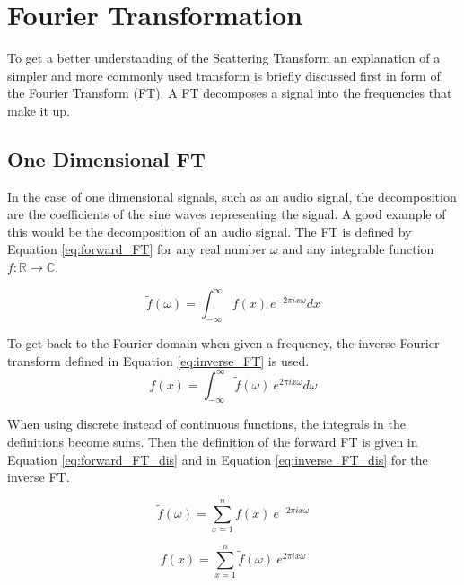 
\section{Fourier Transformation}
\label{sec:fourier_transform}

To get a better understanding of the Scattering Transform an explanation of a simpler and more commonly used transform is briefly discussed first in form of the Fourier Transform (FT). A FT decomposes a signal into the frequencies that make it up.

\subsection{One Dimensional FT} 

In the case of one dimensional signals, such as an audio signal, the decomposition are the coefficients of the sine waves representing the signal. A good example of this would be the decomposition of an audio signal. The FT is defined by Equation \ref{eq:forward_FT} for any real number $\omega$ and any integrable function $f:\mathbb{R} \rightarrow \mathbb{C}$. 

\begin{equation}
	\tilde{f}(\omega) = \int_{-\infty}^{\infty} f(x)\ e^{-2\pi i x \omega}dx
	\label{eq:forward_FT}
\end{equation} 

To get back to the Fourier domain when given a frequency, the inverse Fourier transform defined in Equation \ref{eq:inverse_FT} is used.  \\

\begin{equation}
	f(x) = \int_{-\infty}^{\infty} \tilde{f}(\omega)\ e^{2 \pi i x \omega}d\omega
	\label{eq:inverse_FT}
\end{equation}

When using discrete instead of continuous functions, the integrals in the definitions become sums. Then the definition of the forward FT is given in Equation \ref{eq:forward_FT_dis} and in Equation \ref{eq:inverse_FT_dis} for the inverse FT. 

\begin{equation}
\tilde{f}(\omega) = \sum_{x=1}^{n} f(x)\ e^{-2\pi i x \omega}
\label{eq:forward_FT_dis}
\end{equation} 

\begin{equation}
f(x) = \sum_{x=1}^{n} \tilde{f}(\omega)\ e^{2 \pi i x \omega}
\label{eq:inverse_FT_dis}
\end{equation}

